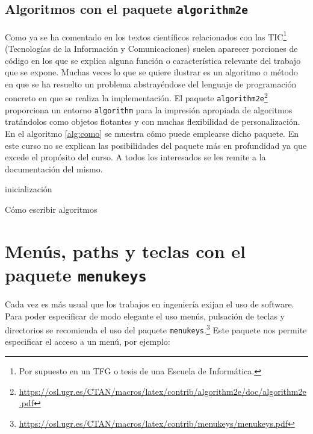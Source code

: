 \documentclass[11pt,a4paper]{article}
\begin{document}
\subsection{Algoritmos con el paquete \texttt{algorithm2e}}
Como ya se ha comentado en los textos científicos relacionados con las TIC\footnote{Por supuesto en un TFG o tesis de una Escuela de Informática.} (Tecnologías de la Información y Comunicaciones) suelen aparecer porciones de código en los que se explica alguna función o característica relevante del trabajo que se expone. Muchas veces lo que se quiere ilustrar es un algoritmo o método en que se ha resuelto un problema abstrayéndose del lenguaje de programación concreto en que se realiza la implementación. El paquete \texttt{algorithm2e}\footnote{\url{https://osl.ugr.es/CTAN/macros/latex/contrib/algorithm2e/doc/algorithm2e.pdf}} proporciona un entorno \texttt{algorithm} para la impresión apropiada de algoritmos tratándolos como objetos flotantes y con muchas flexibilidad de personalización. En el algoritmo \ref{alg:como} se muestra cómo puede emplearse dicho paquete. En este curso no se explican las posibilidades del paquete más en profundidad ya que excede el propósito del curso. A todos los interesados se les remite a la documentación del mismo.


\IncMargin{1em}
\begin{algorithm}
\LinesNumbered
\SetAlgoLined


inicialización\;

\caption{Cómo escribir algoritmos}\label{alg:como}
\end{algorithm}\DecMargin{1em}

\newpage

\section{Menús, paths y teclas con el paquete \texttt{menukeys}}
Cada vez es más usual que los trabajos en ingeniería exijan el uso de software. Para poder especificar de modo elegante el uso menús, pulsación de teclas y directorios se recomienda el uso del paquete \texttt{menukeys}.\footnote{\url{https://osl.ugr.es/CTAN/macros/latex/contrib/menukeys/menukeys.pdf}} Este paquete nos permite especificar el acceso a un menú, por ejemplo:
\end{document}
